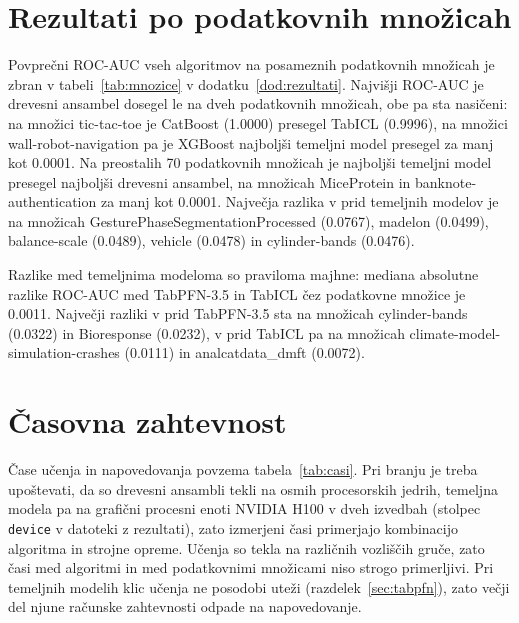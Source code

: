 \documentclass[a4paper,12pt,openright]{book}
\begin{document}
\section{Rezultati po podatkovnih množicah}
\label{sec:rez-mnozice}

Povprečni ROC-AUC vseh algoritmov na posameznih podatkovnih množicah je zbran v
tabeli~\ref{tab:mnozice} v dodatku~\ref{dod:rezultati}. Najvišji ROC-AUC je drevesni ansambel dosegel le na
dveh podatkovnih množicah, obe pa sta nasičeni: na množici tic-tac-toe je
CatBoost (\num{1.0000}) presegel TabICL (\num{0.9996}), na množici
wall-robot-navigation pa je XGBoost najboljši temeljni model presegel za manj kot
\num{0.0001}. Na preostalih 70 podatkovnih množicah je najboljši temeljni model
presegel najboljši drevesni ansambel, na množicah MiceProtein in
banknote-authentication za manj kot \num{0.0001}. Največja razlika v prid
temeljnih modelov je na množicah GesturePhaseSegmentationProcessed
(\num{0.0767}), madelon (\num{0.0499}), balance-scale (\num{0.0489}), vehicle
(\num{0.0478}) in cylinder-bands (\num{0.0476}).

Razlike med temeljnima modeloma so praviloma majhne: mediana absolutne razlike
ROC-AUC med TabPFN-3.5 in TabICL čez podatkovne množice je \num{0.0011}.
Največji razliki v prid TabPFN-3.5 sta na množicah cylinder-bands
(\num{0.0322}) in Bioresponse (\num{0.0232}), v prid TabICL pa na množicah
climate-model-simulation-crashes (\num{0.0111}) in analcatdata\_dmft
(\num{0.0072}).

\section{Časovna zahtevnost}
\label{sec:rez-casi}

Čase učenja in napovedovanja povzema tabela~\ref{tab:casi}. Pri branju je treba
upoštevati, da so drevesni ansambli tekli na osmih procesorskih jedrih,
temeljna modela pa na grafični procesni enoti NVIDIA H100 v dveh izvedbah
(stolpec \texttt{device} v datoteki z rezultati), zato izmerjeni časi
primerjajo kombinacijo algoritma in strojne opreme. Učenja so tekla na
različnih vozliščih gruče, zato časi med algoritmi in med podatkovnimi
množicami niso strogo primerljivi. Pri temeljnih modelih klic učenja ne
posodobi uteži (razdelek~\ref{sec:tabpfn}), zato večji del njune računske
zahtevnosti odpade na napovedovanje.
\end{document}
